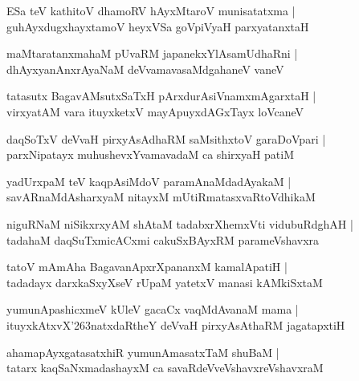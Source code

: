 \documentclass[twoside,12pt,openright]{book}
\def\S{\char'263}
\newcounter{shloka}[chapter]
\begin{document}
\begin{shloka}%
ESa teV kathitoV dhamoRV hAyxMtaroV munisatatxma |\\
guhAyxdugxhayxtamoV heyxVSa goVpiVyaH parxyatanxtaH 
\end{shloka}

\begin{shloka}%
maMtaratanxmahaM pUvaRM japanekxYlAsamUdhaRni |\\
dhAyxyanAnxrAyaNaM deVvamavasaMdgahaneV vaneV 
\end{shloka}

\begin{shloka}%
tatasutx BagavAMsutxSaTxH pArxdurAsiVnamxmAgarxtaH |\\
virxyatAM vara ituyxketxV mayApuyxdAGxTayx loVcaneV 
\end{shloka}

\begin{shloka}%
daqSoTxV deVvaH pirxyAsAdhaRM saMsithxtoV garaDoVpari |\\
parxNipatayx muhushevxYvamavadaM ca shirxyaH patiM 
\end{shloka}

\begin{shloka}%
yadUrxpaM teV kaqpAsiMdoV paramAnaMdadAyakaM |\\
savARnaMdAsharxyaM nitayxM mUtiRmatasxvaRtoVdhikaM 
\end{shloka}

\begin{shloka}%
niguRNaM niSikxrxyAM shAtaM tadabxrXhemxVti vidubuRdghAH |\\
tadahaM daqSuTxmicACxmi cakuSxBAyxRM parameVshavxra
\end{shloka}

\begin{shloka}%
tatoV mAmAha BagavanApxrXpananxM kamalApatiH |\\
tadadayx darxkaSxyXseV rUpaM yatetxV manasi kAMkiSxtaM 
\end{shloka}

\begin{shloka}%
yumunApashicxmeV kUleV gacaCx vaqMdAvanaM mama |\\
ituyxkAtxvX\S natxdaRtheY deVvaH pirxyAsAthaRM jagatapxtiH 
\end{shloka}

\begin{shloka}%
ahamapAyxgatasatxhiR yumunAmasatxTaM shuBaM |\\
tatarx kaqSaNxmadashayxM ca savaRdeVveVshavxreVshavxraM 
\end{shloka}
\end{document}
